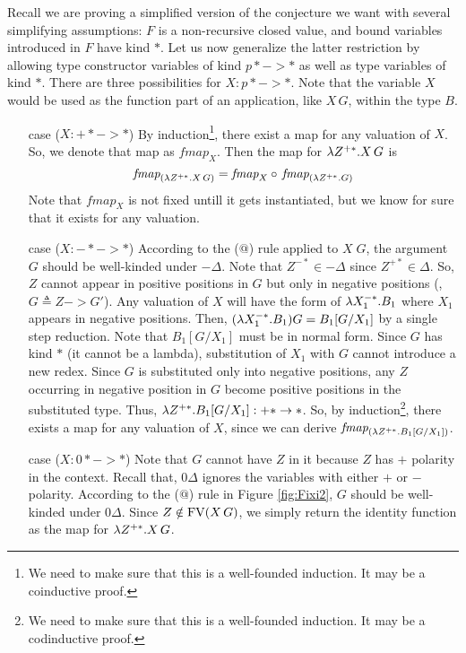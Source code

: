 Recall we are proving a simplified version of the conjecture we want with
several simplifying assumptions: $F$ is a non-recursive closed value, and
bound variables introduced in $F$ have kind $*$. Let us now generalize
the latter restriction by allowing type constructor variables of kind $p* -> *$
as well as type variables of kind $*$. There are three possibilities for
$X:p* -> *$. Note that the variable $X$ would be used as the function part of
an application, like $X\,G$, within the type $B$.
\begin{itemize}
\item[case]($X : +* -> *$)
        By induction\footnote{
                We need to make sure that this is a well-founded induction.
                It may be a coinductive proof.},
        there exist a map for any valuation of $X$.
        So, we denote that map as $\textit{fmap}_{X}$.
        Then the map for $\lambda Z^{+*}.X\,G$ is
        \[ \textit{fmap}_{(\lambda Z^{+*}.X\,G)} =
                \textit{fmap}_{X} \circ\, \textit{fmap}_{(\lambda Z^{+*}.G)} \]
        Note that $\textit{fmap}_{X}$ is not fixed untill it gets
        instantiated, but we know for sure that it exists for any
        valuation.

\item[case]($X : -* -> *$)
        According to the ($@$) rule applied to $X\;G$, the argument $G$ should be well-kinded under $-\Delta$.
        Note that $Z^{-*}\in-\Delta$ since $Z^{+*}\in \Delta$.
        So, $Z$ cannot appear in positive positions in $G$ but only in
        negative positions (\eg, $G \triangleq Z -> G'$).
        Any valuation of $X$ will have the form of $\lambda X_1^{-*}.B_1$
        where $X_1$ appears in negative positions.
        Then, $(\lambda X_1^{-*}.B_1)G = B_1[G/X_1]$ by a single step reduction.
        Note that $B_1[G/X_1]$ must be in normal form. Since $G$ has kind $*$
        (it cannot be a lambda), substitution of $X_1$ with $G$ cannot
        introduce a new redex. Since $G$ is substituted only into
        negative positions, any $Z$ occurring in negative position in $G$
        become positive positions in the substituted type.
        Thus, $\lambda Z^{+*}.B_1[G/X_1] : +* -> *$.
        So, by induction\footnote{
                We need to make sure that this is a well-founded induction.
                It may be a codinductive proof.},
        there exists a map for any valuation of $X$,
        since we can derive $\textit{fmap}_{(\lambda Z^{+*}.B_1[G/X_1])}$.

\item[case]($X : 0* -> *$)
        Note that $G$ cannot have $Z$ in it because $Z$ has $+$ polarity
        in the context. Recall that, $0\Delta$ ignores the variables
        with either $+$ or $-$ polarity. According to the ($@$) rule
        in Figure \ref{fig:Fixi2}, $G$ should be well-kinded under $0\Delta$.
        Since $Z\notin\mathop{\mathrm{FV}}(X\,G)$, we simply return the identity function
        as the map for $\lambda Z^{+*}.X\,G$.
\end{itemize}
